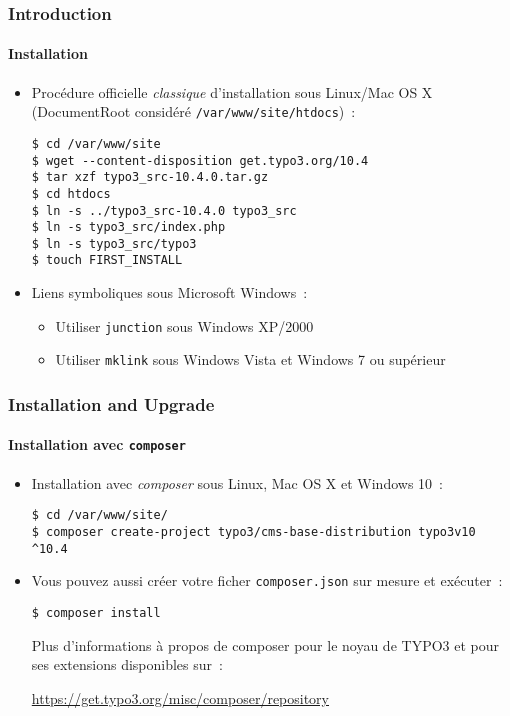 
\begin{frame}[fragile]
	\frametitle{Introduction}
	\framesubtitle{Installation}

	\begin{itemize}
		\item Procédure officielle \textit{classique} d'installation sous Linux/Mac OS X\newline
			(DocumentRoot considéré \texttt{/var/www/site/htdocs})~:
\begin{lstlisting}
$ cd /var/www/site
$ wget --content-disposition get.typo3.org/10.4
$ tar xzf typo3_src-10.4.0.tar.gz
$ cd htdocs
$ ln -s ../typo3_src-10.4.0 typo3_src
$ ln -s typo3_src/index.php
$ ln -s typo3_src/typo3
$ touch FIRST_INSTALL
\end{lstlisting}

		\item Liens symboliques sous Microsoft Windows~:

			\begin{itemize}
				\item Utiliser \texttt{junction} sous Windows XP/2000
				\item Utiliser \texttt{mklink} sous Windows Vista et Windows 7 ou supérieur
			\end{itemize}

	\end{itemize}
\end{frame}


\begin{frame}[fragile]
	\frametitle{Installation and Upgrade}
	\framesubtitle{Installation avec \texttt{composer}}

	\begin{itemize}
		\item Installation avec \textit{composer} sous Linux, Mac OS X et Windows 10~:
\begin{lstlisting}
$ cd /var/www/site/
$ composer create-project typo3/cms-base-distribution typo3v10 ^10.4
\end{lstlisting}

		\item Vous pouvez aussi créer votre ficher \texttt{composer.json} sur mesure
			et exécuter~:
\begin{lstlisting}
$ composer install
\end{lstlisting}

			Plus d'informations à propos de composer pour le noyau de TYPO3 et pour ses
			extensions disponibles sur~:

			\small
				\href{https://get.typo3.org/misc/composer/repository}{https://get.typo3.org/misc/composer/repository}
			\normalsize

	\end{itemize}
\end{frame}

